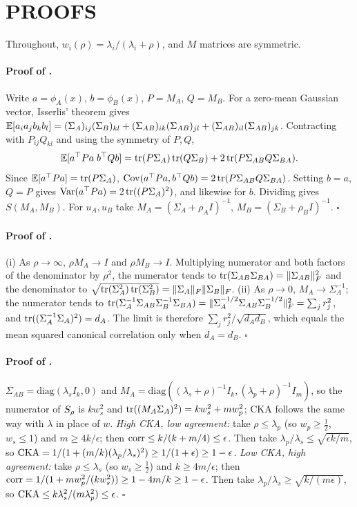 \section{PROOFS}
\label{app:proofs}

Throughout, $w_i(\rho)=\lambda_i/(\lambda_i+\rho)$, and $M$ matrices are symmetric.

\paragraph{Proof of .}
Write $a=\phi_A(x)$, $b=\phi_B(x)$, $P=M_A$, $Q=M_B$. For a zero-mean Gaussian vector, Isserlis' theorem \citep{isserlis1918} gives
$\mathbb{E}[a_ia_jb_kb_l]=(\Sigma_A)_{ij}(\Sigma_B)_{kl}+(\Sigma_{AB})_{ik}(\Sigma_{AB})_{jl}+(\Sigma_{AB})_{il}(\Sigma_{AB})_{jk}$.
Contracting with $P_{ij}Q_{kl}$ and using the symmetry of $P,Q$,
\[
\mathbb{E}[a^\top Pa\; b^\top Qb]=\operatorname{tr}(P\Sigma_A)\operatorname{tr}(Q\Sigma_B)+2\operatorname{tr}(P\Sigma_{AB}Q\Sigma_{BA}).
\]
Since $\mathbb{E}[a^\top Pa]=\operatorname{tr}(P\Sigma_A)$, $\mathrm{Cov}(a^\top Pa,b^\top Qb)=2\operatorname{tr}(P\Sigma_{AB}Q\Sigma_{BA})$. Setting $b=a$, $Q=P$ gives $\mathrm{Var}(a^\top Pa)=2\operatorname{tr}((P\Sigma_A)^2)$, and likewise for $b$. Dividing gives $S(M_A,M_B)$. For $u_A,u_B$ take $M_A=(\Sigma_A+\rho_AI)^{-1}$, $M_B=(\Sigma_B+\rho_BI)^{-1}$. \hfill$\square$

\paragraph{Proof of .}
(i) As $\rho\to\infty$, $\rho M_A\to I$ and $\rho M_B\to I$. Multiplying numerator and both factors of the denominator by $\rho^2$, the numerator tends to $\operatorname{tr}(\Sigma_{AB}\Sigma_{BA})=\|\Sigma_{AB}\|_F^2$ and the denominator to $\sqrt{\operatorname{tr}(\Sigma_A^2)\operatorname{tr}(\Sigma_B^2)}=\|\Sigma_A\|_F\|\Sigma_B\|_F$.
(ii) As $\rho\to0$, $M_A\to\Sigma_A^{-1}$; the numerator tends to $\operatorname{tr}(\Sigma_A^{-1}\Sigma_{AB}\Sigma_B^{-1}\Sigma_{BA})=\|\Sigma_A^{-1/2}\Sigma_{AB}\Sigma_B^{-1/2}\|_F^2=\sum_jr_j^2$, and $\operatorname{tr}((\Sigma_A^{-1}\Sigma_A)^2)=d_A$. The limit is therefore $\sum_jr_j^2/\sqrt{d_Ad_B}$, which equals the mean squared canonical correlation only when $d_A=d_B$. \hfill$\square$

\paragraph{Proof of .}
$\Sigma_{AB}=\mathrm{diag}(\lambda_sI_k,0)$ and $M_A=\mathrm{diag}((\lambda_s+\rho)^{-1}I_k,(\lambda_p+\rho)^{-1}I_m)$, so the numerator of $S_{\rho}$ is $kw_s^2$ and $\operatorname{tr}((M_A\Sigma_A)^2)=kw_s^2+mw_p^2$; CKA follows the same way with $\lambda$ in place of $w$.
\emph{High CKA, low agreement:} take $\rho\le\lambda_p$ (so $w_p\ge\frac12$, $w_s\le1$) and $m\ge4k/\epsilon$; then $\operatorname{corr}\le k/(k+m/4)\le\epsilon$. Then take $\lambda_p/\lambda_s\le\sqrt{\epsilon k/m}$, so $\operatorname{CKA}=1/(1+(m/k)(\lambda_p/\lambda_s)^2)\ge1/(1+\epsilon)\ge1-\epsilon$.
\emph{Low CKA, high agreement:} take $\rho\le\lambda_s$ (so $w_s\ge\frac12$) and $k\ge4m/\epsilon$; then $\operatorname{corr}=1/(1+mw_p^2/(kw_s^2))\ge1-4m/k\ge1-\epsilon$. Then take $\lambda_p/\lambda_s\ge\sqrt{k/(m\epsilon)}$, so $\operatorname{CKA}\le k\lambda_s^2/(m\lambda_p^2)\le\epsilon$. \hfill$\square$

